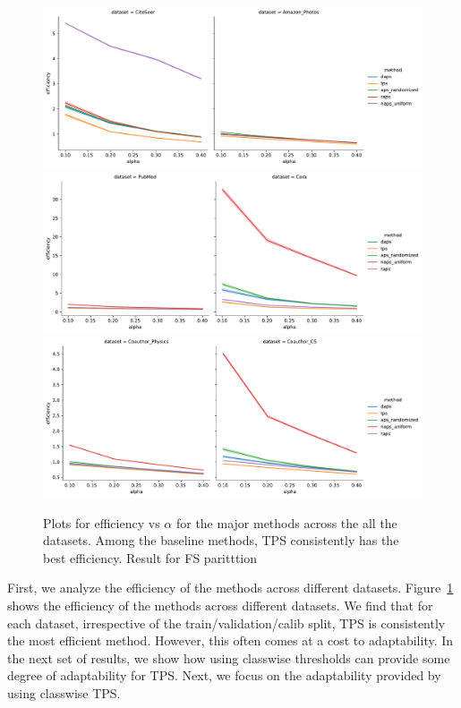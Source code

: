 \begin{figure}
    \centering
    \includegraphics[width=\linewidth]{graphConformal/figures/split/small_datasets_efficiency.pdf}
    \includegraphics[width=\linewidth]{graphConformal/figures/split/med_1_datasets_efficiency.pdf}
    \includegraphics[width=\linewidth]{graphConformal/figures/split/med_2_datasets_efficiency.pdf}
    \caption{Plots for efficiency vs $\alpha$ for the major methods across the all the datasets. Among the baseline methods, TPS consistently has the best efficiency. Result for FS paritttion}
    \label{fig:fs:conformal:efficiency_vs_alpha}
\end{figure}

First, we analyze the efficiency of the methods across different datasets.
Figure~\ref{fig:fs:conformal:efficiency_vs_alpha} shows the efficiency of the methods across different datasets.
We find that for each dataset, irrespective of the train/validation/calib split, TPS is consistently the most efficient method.
However, this often comes at a cost to adaptability.
In the next set of results, we show how using classwise thresholds can provide some degree of adaptability for TPS.
Next, we focus on the adaptability provided by using classwise TPS.

